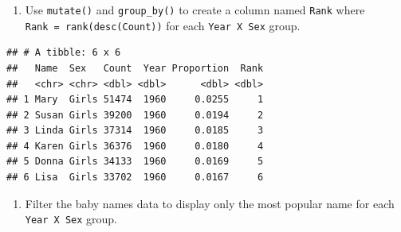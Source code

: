 \documentclass[]{book}
\newenvironment{Shaded}{\begin{snugshade}}{\end{snugshade}}
\newcommand{\KeywordTok}[1]{\textcolor[rgb]{0.13,0.29,0.53}{\textbf{#1}}}
\newcommand{\DataTypeTok}[1]{\textcolor[rgb]{0.13,0.29,0.53}{#1}}
\newcommand{\DecValTok}[1]{\textcolor[rgb]{0.00,0.00,0.81}{#1}}
\newcommand{\StringTok}[1]{\textcolor[rgb]{0.31,0.60,0.02}{#1}}
\newcommand{\OperatorTok}[1]{\textcolor[rgb]{0.81,0.36,0.00}{\textbf{#1}}}
\newcommand{\NormalTok}[1]{#1}
\providecommand{\tightlist}{%
  \setlength{\itemsep}{0pt}\setlength{\parskip}{0pt}}
\begin{document}
\begin{enumerate}
\def\labelenumi{\arabic{enumi}.}
\setcounter{enumi}{1}
\tightlist
\item
  Use \texttt{mutate()} and \texttt{group\_by()} to create a column
  named \texttt{Rank} where \texttt{Rank\ =\ rank(desc(Count))} for each
  \texttt{Year\ X\ Sex} group.
\end{enumerate}

\begin{Shaded}
\end{Shaded}

\begin{verbatim}
## # A tibble: 6 x 6
##   Name  Sex   Count  Year Proportion  Rank
##   <chr> <chr> <dbl> <dbl>      <dbl> <dbl>
## 1 Mary  Girls 51474  1960     0.0255     1
## 2 Susan Girls 39200  1960     0.0194     2
## 3 Linda Girls 37314  1960     0.0185     3
## 4 Karen Girls 36376  1960     0.0180     4
## 5 Donna Girls 34133  1960     0.0169     5
## 6 Lisa  Girls 33702  1960     0.0167     6
\end{verbatim}

\begin{enumerate}
\def\labelenumi{\arabic{enumi}.}
\setcounter{enumi}{2}
\tightlist
\item
  Filter the baby names data to display only the most popular name for
  each \texttt{Year\ X\ Sex} group.
\end{enumerate}

\begin{Shaded}
\end{Shaded}
\end{document}

